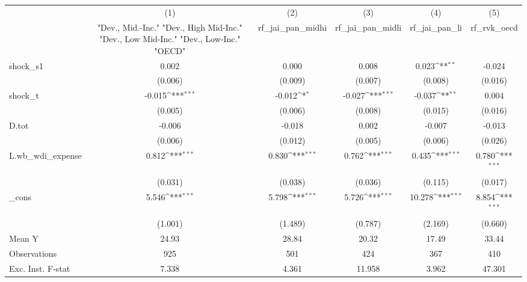 {
\def\sym#1{\ifmmode^{#1}\else\(^{#1}\)\fi}
\begin{tabular}{l*{5}{c}}
\toprule
            &\multicolumn{1}{c}{(1)}&\multicolumn{1}{c}{(2)}&\multicolumn{1}{c}{(3)}&\multicolumn{1}{c}{(4)}&\multicolumn{1}{c}{(5)}\\
            &\multicolumn{1}{c}{ "Dev., Mid.-Inc." "Dev., High Mid-Inc." "Dev., Low Mid-Inc." "Dev., Low-Inc." "OECD" }&\multicolumn{1}{c}{rf\_jai\_pan\_midhi}&\multicolumn{1}{c}{rf\_jai\_pan\_midli}&\multicolumn{1}{c}{rf\_jai\_pan\_li}&\multicolumn{1}{c}{rf\_rvk\_oecd}\\
\midrule
shock\_s1    &       0.002         &       0.000         &       0.008         &       0.023\sym{**} &      -0.024         \\
            &     (0.006)         &     (0.009)         &     (0.007)         &     (0.008)         &     (0.016)         \\
\addlinespace
shock\_t     &      -0.015\sym{***}&      -0.012\sym{*}  &      -0.027\sym{***}&      -0.037\sym{**} &       0.004         \\
            &     (0.005)         &     (0.006)         &     (0.008)         &     (0.015)         &     (0.016)         \\
\addlinespace
D.tot       &      -0.006         &      -0.018         &       0.002         &      -0.007         &      -0.013         \\
            &     (0.006)         &     (0.012)         &     (0.005)         &     (0.006)         &     (0.026)         \\
\addlinespace
L.wb\_wdi\_expense&       0.812\sym{***}&       0.830\sym{***}&       0.762\sym{***}&       0.435\sym{***}&       0.780\sym{***}\\
            &     (0.031)         &     (0.038)         &     (0.036)         &     (0.115)         &     (0.017)         \\
\addlinespace
\_cons      &       5.546\sym{***}&       5.798\sym{***}&       5.726\sym{***}&      10.278\sym{***}&       8.854\sym{***}\\
            &     (1.001)         &     (1.489)         &     (0.787)         &     (2.169)         &     (0.660)         \\
\midrule
Mean Y      &       24.93         &       28.84         &       20.32         &       17.49         &       33.44         \\
Observations&         925         &         501         &         424         &         367         &         410         \\
Exc. Inst. F-stat&       7.338         &       4.361         &      11.958         &       3.962         &      47.301         \\
\bottomrule
\end{tabular}
}
